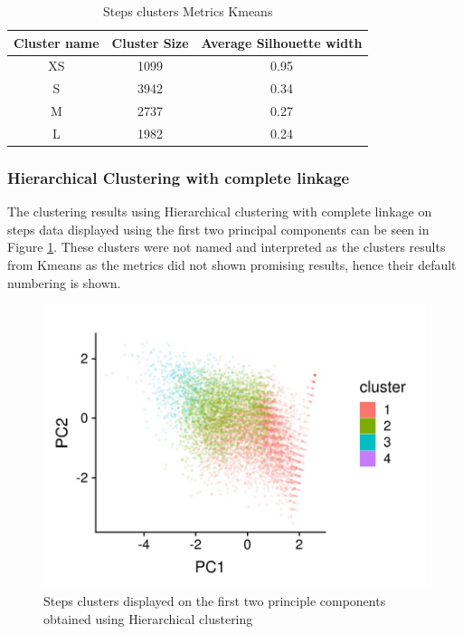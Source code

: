 \documentclass{article}
\begin{document}
\begin{table}[H]
  \caption{Steps clusters Metrics Kmeans}
  \label{steps_metrics}
  \centering
  \begin{tabular}{ c|c|c}
    \toprule
    \cmidrule(r){1-2}
    Cluster name & Cluster Size & Average Silhouette width \\
    \midrule
    XS & 1099 & 0.95 \\
    S & 3942 & 0.34 \\
    M & 2737 & 0.27 \\
    L & 1982 & 0.24 \\
    \bottomrule
    \end{tabular}
\end{table}

\subsubsection{Hierarchical Clustering with complete linkage}
\label{appendix:stepsHC}
The clustering results using Hierarchical clustering with complete linkage on steps data displayed using the first two principal components can be seen in Figure \ref{fig:stepsClustersHC}. These clusters were not named and interpreted as the clusters results from Kmeans as the metrics did not shown promising results, hence their default numbering is shown.

\begin{figure}[H]
  \centering
  \includegraphics[]{steps_HC_results.jpg}
  \caption{Steps clusters displayed on the first two principle components obtained using Hierarchical clustering}
  \label{fig:stepsClustersHC}
\end{figure}
\end{document}
